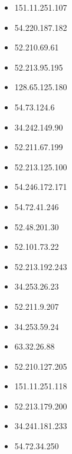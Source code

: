 \documentclass{article}
\begin{document}
\begin{itemize}
    
        \item 151.11.251.107
    
        \item 54.220.187.182
    
        \item 52.210.69.61
    
        \item 52.213.95.195
    
        \item 128.65.125.180
    
        \item 54.73.124.6
    
        \item 34.242.149.90
    
        \item 52.211.67.199
    
        \item 52.213.125.100
    
        \item 54.246.172.171
    
        \item 54.72.41.246
    
        \item 52.48.201.30
    
        \item 52.101.73.22
    
        \item 52.213.192.243
    
        \item 34.253.26.23
    
        \item 52.211.9.207
    
        \item 34.253.59.24
    
        \item 63.32.26.88
    
        \item 52.210.127.205
    
        \item 151.11.251.118
    
        \item 52.213.179.200
    
        \item 34.241.181.233
    
        \item 54.72.34.250
    

\end{itemize}
\end{document}
